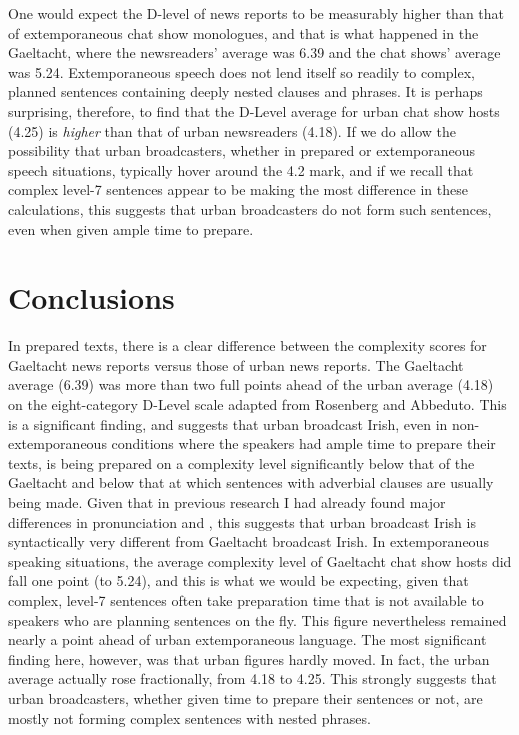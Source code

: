 \documentclass[output=paper,colorlinks,citecolor=brown]{langscibook}
\begin{document}
One would expect the D-level of news reports to be measurably higher than that of extemporaneous chat show monologues, and that is what happened in the Gaeltacht, where the newsreaders' average was 6.39 and the chat shows' average was 5.24. Extemporaneous speech does not lend itself so readily to complex, planned sentences containing deeply nested clauses and phrases. It is perhaps surprising, therefore, to find that the D-Level average for urban chat show hosts (4.25) is \textit{higher} than that of urban newsreaders (4.18). If we do allow the possibility that urban broadcasters, whether in prepared or extemporaneous speech situations, typically hover around the 4.2 mark, and if we recall that complex level-7 sentences appear to be making the most difference in these calculations, this suggests that urban broadcasters do not form such sentences, even when given ample time to prepare.

\section{Conclusions}

In prepared texts, there is a clear difference between the complexity scores for Gaeltacht news reports versus those of urban news reports. The Gaeltacht average (6.39) was more than two full points ahead of the urban average (4.18) on the eight-category D-Level scale adapted from Rosenberg and Abbeduto. This is a significant finding, and suggests that urban broadcast Irish, even in non-extemporaneous conditions where the speakers had ample time to prepare their texts, is being prepared on a complexity level significantly below that of the Gaeltacht and below that at which sentences with adverbial clauses are usually being made. Given that in previous research I had already found major differences in pronunciation and , this suggests that urban broadcast Irish is syntactically very different from Gaeltacht broadcast Irish.
In extemporaneous speaking situations, the average complexity level of Gaeltacht chat show hosts did fall one point (to 5.24), and this is what we would be expecting, given that complex, level-7 sentences often take preparation time that is not available to speakers who are planning sentences on the fly. This figure nevertheless remained nearly a point ahead of urban extemporaneous language. The most significant finding here, however, was that urban figures hardly moved. In fact, the urban average actually rose fractionally, from 4.18 to 4.25. This strongly suggests that urban broadcasters, whether given time to prepare their sentences or not, are mostly not forming complex sentences with nested phrases.
\end{document}

